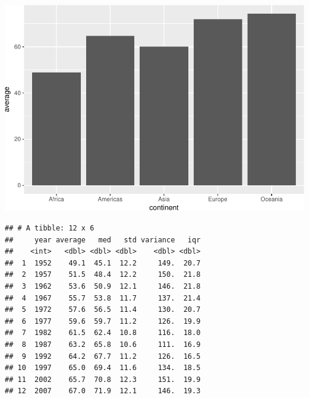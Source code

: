 \documentclass[11pt,]{article}
\newenvironment{Shaded}{\begin{snugshade}}{\end{snugshade}}
\newcommand{\KeywordTok}[1]{\textcolor[rgb]{0.13,0.29,0.53}{\textbf{#1}}}
\newcommand{\DataTypeTok}[1]{\textcolor[rgb]{0.13,0.29,0.53}{#1}}
\newcommand{\StringTok}[1]{\textcolor[rgb]{0.31,0.60,0.02}{#1}}
\newcommand{\OperatorTok}[1]{\textcolor[rgb]{0.81,0.36,0.00}{\textbf{#1}}}
\newcommand{\NormalTok}[1]{#1}
\begin{document}
\includegraphics{Intro_data_wrangling_files/figure-latex/summ_cont-1.pdf}

\begin{Shaded}
\end{Shaded}

\begin{verbatim}
## # A tibble: 12 x 6
##     year average   med   std variance   iqr
##    <int>   <dbl> <dbl> <dbl>    <dbl> <dbl>
##  1  1952    49.1  45.1  12.2     149.  20.7
##  2  1957    51.5  48.4  12.2     150.  21.8
##  3  1962    53.6  50.9  12.1     146.  21.8
##  4  1967    55.7  53.8  11.7     137.  21.4
##  5  1972    57.6  56.5  11.4     130.  20.7
##  6  1977    59.6  59.7  11.2     126.  19.9
##  7  1982    61.5  62.4  10.8     116.  18.0
##  8  1987    63.2  65.8  10.6     111.  16.9
##  9  1992    64.2  67.7  11.2     126.  16.5
## 10  1997    65.0  69.4  11.6     134.  18.5
## 11  2002    65.7  70.8  12.3     151.  19.9
## 12  2007    67.0  71.9  12.1     146.  19.3
\end{verbatim}
\end{document}
